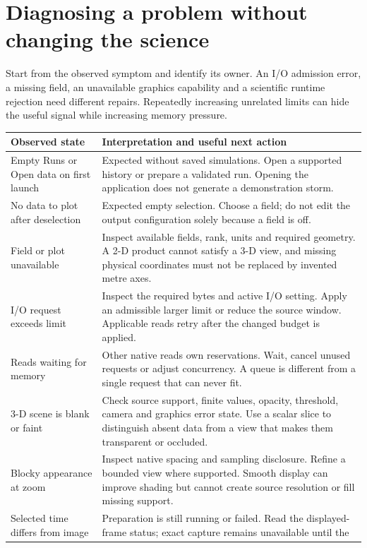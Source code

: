 \section{Diagnosing a problem without changing the science}
Start from the observed symptom and identify its owner. An I/O admission error,
a missing field, an unavailable graphics capability and a scientific runtime
rejection need different repairs. Repeatedly increasing unrelated limits can
hide the useful signal while increasing memory pressure.

\begin{longtable}{@{}p{}p{}@{}}
\toprule
Observed state & Interpretation and useful next action\\
\midrule
\endhead
Empty Runs or Open data on first launch & Expected without saved simulations.
Open a supported history or prepare a validated run. Opening the application
does not generate a demonstration storm.\\[0.6em]
No data to plot after deselection & Expected empty selection. Choose a field;
do not edit the output configuration solely because a field is off.\\[0.6em]
Field or plot unavailable & Inspect available fields, rank, units and required
geometry. A 2-D product cannot satisfy a 3-D view, and missing physical coordinates
must not be replaced by invented metre axes.\\[0.6em]
I/O request exceeds limit & Inspect the required bytes and active I/O setting.
Apply an admissible larger limit or reduce the source window. Applicable reads
retry after the changed budget is applied.\\[0.6em]
Reads waiting for memory & Other native reads own reservations. Wait, cancel
unused requests or adjust concurrency. A queue is different from a single
request that can never fit.\\[0.6em]
3-D scene is blank or faint & Check source support, finite values, opacity,
threshold, camera and graphics error state. Use a scalar slice to distinguish
absent data from a view that makes them transparent or occluded.\\[0.6em]
Blocky appearance at zoom & Inspect native spacing and sampling disclosure.
Refine a bounded view where supported. Smooth display can improve shading but
cannot create source resolution or fill missing support.\\[0.6em]
Selected time differs from image & Preparation is still running or failed.
Read the displayed-frame status; exact capture remains unavailable until the

\end{longtable}
